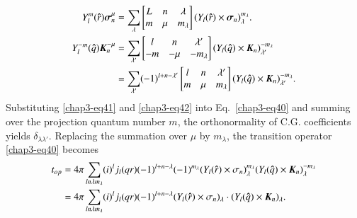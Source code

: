 \begin{align}
  Y_l^m ({\boldsymbol \hat{r}}) {\boldsymbol \sigma}_n^\mu & = \sum_{\lambda}
  \begin{bmatrix} L & n & \lambda\\ m & \mu & m_\lambda \end{bmatrix} (Y_l ({\boldsymbol \hat{r}}) \times {\boldsymbol \sigma_n})_\lambda^{m_\lambda}. \label{chap3-eq41}\\
  Y_l^{-m} ({\boldsymbol \hat{q}}) {\boldsymbol K}_n^{-\mu} & = \sum_{\lambda'}
  \begin{bmatrix}    l & n & \lambda' \\ -m & -\mu & -m_\lambda  \end{bmatrix}
  (Y_l ({\boldsymbol \hat{q}}) \times {\boldsymbol K}_n)_{\lambda'}^{-m_\lambda} \notag \\
  & = \sum_{\lambda '} (-1)^{l + n - \lambda'}
  \begin{bmatrix}    l & n & \lambda'\\ m & \mu & m_\lambda  \end{bmatrix}
  (Y_l ({\boldsymbol \hat{q}}) \times {\boldsymbol K}_n)_{\lambda'}^{-m_\lambda}. \label{chap3-eq42}
\end{align}
Substituting \eqref{chap3-eq41} and \eqref{chap3-eq42} into Eq.\ \eqref{chap3-eq40} and summing over the projection quantum number $m$, the orthonormality of C.G. coefficients yields $\delta_{\lambda \lambda'}$. Replacing the summation over $\mu$ by $m_{\lambda}$, the transition operator \eqref{chap3-eq40} becomes
\begin{align}
  t_{op} & = 4 \pi \sum_{ln \lambda m_\lambda} (i)^l j_l (qr) (-1)^{l + n - \lambda} (-1)^{m_\lambda} (Y_l({\boldsymbol \hat{r}}) \times \sigma_n)_\lambda^{m_\lambda} (Y_l ({\boldsymbol \hat{q}}) \times {\boldsymbol K}_n)_\lambda^{-m_\lambda} \notag \\
  & = 4 \pi \sum_{ln \lambda m_\lambda} (i)^l j_l (qr) (-1)^{l+n-\lambda} (Y_l ({\boldsymbol \hat{r}}) \times \sigma_{n})_\lambda \cdot (Y_l ({\boldsymbol \hat{q}}) \times {\boldsymbol K}_n)_\lambda. \label{chap3-eq43}
\end{align}

